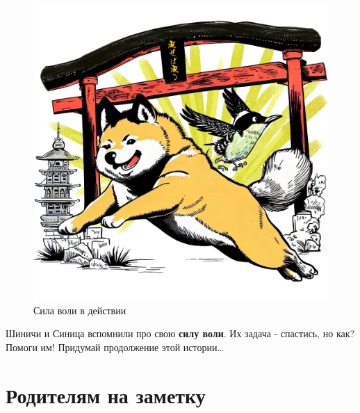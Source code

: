 \documentclass[a5paper,11pt]{memoir}
\begin{document}
\clearpage


\begin{figure}[h]
	\centering
	\includegraphics[width=\textwidth]{images/shinici-sinitsa-rush-hour}
	\caption{Сила воли в действии}
\end{figure}

Шиничи и Синица вспомнили про свою \textbf{силу воли}. Их задача - спастись, но как? Помоги им! Придумай продолжение этой истории\ldots




\clearpage
\hfill
\clearpage
\section*{Родителям на заметку}
\end{document}
